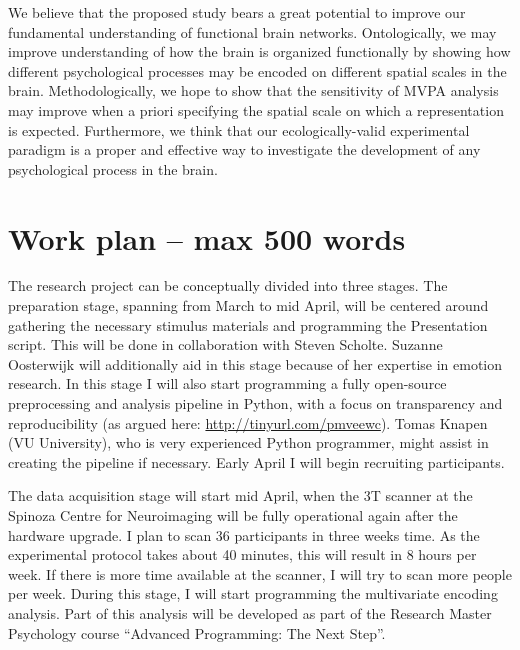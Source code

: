 \documentclass[12pt,a4paper]{article}\usepackage[]{graphicx}\usepackage[]{color}
\begin{document}
We believe that the proposed study bears a great potential to improve our fundamental understanding of functional brain networks. Ontologically, we may improve understanding of how the brain is organized functionally by showing how different psychological processes may be encoded on different spatial scales in the brain. Methodologically, we hope to show that the sensitivity of MVPA analysis may improve when a priori specifying the spatial scale on which a representation is expected. Furthermore, we think that our ecologically-valid experimental paradigm is a proper and effective way to investigate the development of any psychological process in the brain.  

\noindent
\wordcount

\section{Work plan \textmd{– max 500 words}}
The research project can be conceptually divided into three stages. The preparation stage, spanning from March to mid April, will be centered around gathering the necessary stimulus materials and programming the Presentation script. This will be done in collaboration with Steven Scholte. Suzanne Oosterwijk will additionally aid in this stage because of her expertise in emotion research. In this stage I will also start programming a fully open-source preprocessing and analysis pipeline in Python, with a focus on transparency and reproducibility (as argued here: \url{http://tinyurl.com/pmveewc}). Tomas Knapen (VU University), who is very experienced Python programmer, might assist in creating the pipeline if necessary. Early April I will begin recruiting participants. 

The data acquisition stage will start mid April, when the 3T scanner at the Spinoza Centre for Neuroimaging will be fully operational again after the hardware upgrade. I plan to scan 36 participants in three weeks time. As the experimental protocol takes about 40 minutes, this will result in 8 hours per week. If there is more time available at the scanner, I will try to scan more people per week. During this stage, I will start programming the multivariate encoding analysis. Part of this analysis will be developed as part of the Research Master Psychology course ``Advanced Programming: The Next Step''.
\end{document}
